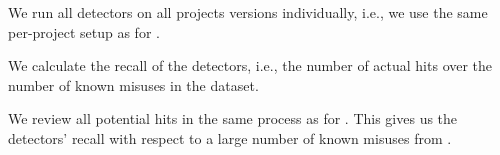 We run all detectors on all projects versions individually, i.e., we use the same per-project setup as for .

We calculate the recall of the detectors, i.e., the number of actual hits over the number of known misuses in the dataset.

We review all potential hits in the same process as for .
This gives us the detectors' recall with respect to a large number of known misuses from \MUBench.

